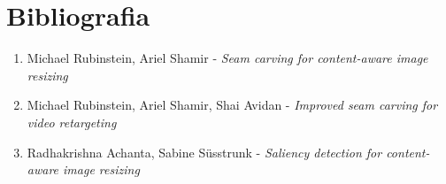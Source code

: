 \documentclass[12pt,a4paper]{report}
\theoremstyle{plain}
\theoremstyle{definition}
\begin{document}
\section*{Bibliografia}
\begin{enumerate}
\item Michael Rubinstein, Ariel Shamir - \textit{Seam carving for content-aware image resizing}
\item Michael Rubinstein, Ariel Shamir, Shai Avidan - \textit{Improved seam carving for video retargeting} 
\item Radhakrishna Achanta, Sabine Süsstrunk - \textit{Saliency detection for content-aware image resizing}
\end{enumerate}
\end{document}
